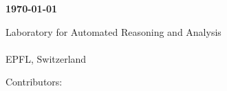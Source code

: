 \begin{titlepage}
\sf

    \begin{center}
        \vspace*{1cm}
 
        \textbf{\Huge \ourtitle}

        \vspace{1.5cm}
        
        
        \textbf{\large \today}
             
        \vspace{1.5cm}
 
        {\Large Laboratory for Automated Reasoning and Analysis \\ \ \\ EPFL, Switzerland}

        \vspace{1.5cm}

        \date{}

    \end{center}

   \vfill

   Contributors:
   \begin{flushright}
     \large
     \ournames
   \end{flushright}
             
 \end{titlepage}
